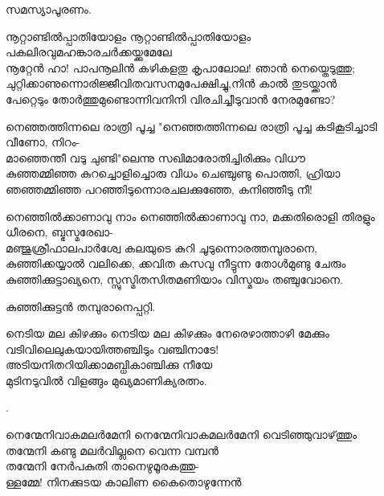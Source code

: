 \begin{enumerate}


സമസ്യാപൂരണം. 


\begin{slokam}{\VSr}{\VKG}{നൂറ്റാണ്ടിൽപ്പാതിയോളം}
നൂറ്റാണ്ടിൽപ്പാതിയോളം പകലിരവുമഹങ്കാരചർക്കയ്ക്കുമേലേ\\
നൂറ്റേൻ ഹാ! പാപനൂലിൻ കഴികളതു കൃപാലോല! ഞാൻ നെയ്തെടുത്തു;\\
ചുറ്റിക്കാണുന്നൊരിജ്ജീവിതവസനമുപേക്ഷിച്ചു,നിൻ കാൽ തുടയ്ക്കാൻ\\
പേറ്റെടും തോർത്തുമുണ്ടൊന്നിവനിനി വിരചിച്ചീടുവാൻ നേരമുണ്ടോ?
\end{slokam}


\begin{slokam}{\VSv}{\SVL}{നെഞ്ഞത്തിന്നലെ രാത്രി പൂച്ച}
"നെഞ്ഞത്തിന്നലെ രാത്രി പൂച്ച കടികൂടിച്ചാടി വീണോ, നിറം-\\
മാഞ്ഞെന്തീ വടു ചുണ്ടി"ലെന്നു സഖിമാരോതിച്ചിരിക്കും വിധൗ\\
കുഞ്ഞമ്മിഞ്ഞ കുറച്ചൊളിച്ചൊരു വിധം ചെഞ്ചുണ്ടു പൊത്തി, ഹ്രിയാ\\
ഞഞ്ഞമ്മിഞ്ഞ പറഞ്ഞിടുന്നൊരചലക്കുഞ്ഞേ, കനിഞ്ഞീടു നീ!
\end{slokam}



\begin{slokam}{\VSr}{\Vyl}{നെഞ്ഞിൽക്കാണാവു നാം}
നെഞ്ഞിൽക്കാണാവു നാ, മക്കതിരൊളി തിരളും ധീരനെ, ബ്ഭസ്മരേഖാ-\\
മഞ്ജുശ്രീഫാലപാർശ്വേ കലയുടെ കുറി ചൂടുന്നൊരത്തമ്പുരാനെ,\\
കുഞ്ഞിക്കയ്യാൽ വലിക്കെ, ക്കവിത കസവു നീട്ടുന്ന തോള്‍മുണ്ടു ചേരും\\
കുഞ്ഞിക്കുട്ടാഖ്യനെ, സ്സുസ്മിതസിതമണിയാം വിസ്മയം തഞ്ചുവോനെ.
\end{slokam}


കുഞ്ഞിക്കുട്ടൻ തമ്പുരാനെപ്പറ്റി.


\begin{slokam}{\VMl}{\Ull}{നെടിയ മല കിഴക്കും}
നെടിയ മല കിഴക്കും നേരെഴാത്താഴി മേക്കും\\
വടിവിലെലുകയായിത്തഞ്ചിടും വഞ്ചിനാടേ!\\
അടിയനിതറിയിക്കാമബ്ധികാഞ്ചിക്കു നീയേ\\
മുടിനടുവിൽ വിളങ്ങും മുഖ്യമാണിക്യരത്നം.
\end{slokam}


.


\begin{slokam}{\VVt}{\Kund}{നെന്മേനിവാകമലർമേനി}
നെന്മേനിവാകമലർമേനി വെടിഞ്ഞുവാഴ്‌ത്തും\\
തന്മേനി കണ്ടു മലർവില്ലനെ വെന്ന വമ്പൻ\\
തന്മേനി നേർപകുതി താനെഴുമൂരകത്തു-\\
ള്ളമ്മേ! നിനക്കുടയ കാലിണ കൈതൊഴുന്നേൻ
\end{slokam}


\end{enumerate}

